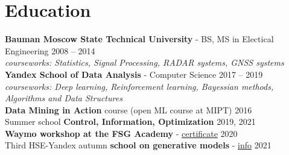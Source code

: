 \section*{\sectionformat Education}
\textbf{Bauman Moscow State Technical University} - BS, MS in Electical Engineering \hfill 2008 -- 2014 \\
\textit{courseworks: Statistics, Signal Processing, RADAR systems, GNSS systems} \\
% 
\textbf{Yandex School of Data Analysis} - Computer Science \hfill 2017 -- 2019 \\
\textit{courseworks: Deep learning, Reinforcement learning, Bayessian methods, Algorithms and Data Structures} \\
% 
\textbf{Data Mining in Action} course (open ML course at MIPT) \hfill    2016         \\
% 
Summer school \textbf{Control, Information, Optimization}                                                                                             \hfill  2019, 2021 \\
%
\textbf{Waymo workshop at the FSG Academy} - \href{https://drive.google.com/file/d/1-WxECccxBrRWIvEt9WQeXKTueiF658r7/view?usp=sharing}{certificate}   \hfill  2020       \\
% 
Third HSE-Yandex autumn \textbf{school on generative models} - \href{https://indico.cern.ch/event/1082512/timetable/#20211123}{info}                  \hfill  2021
\nolinebreak